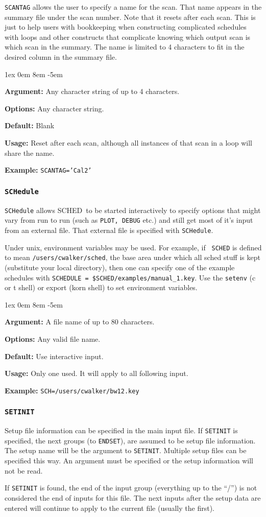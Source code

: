 \documentclass{report}
\newcommand{\schedb}{{\sc SCHED~}}
\newcommand{\rcwbox}[5]{
  \begin{list}{}{\parsep 1ex  \itemsep 0em
                 \leftmargin 8em  \itemindent -5em }
    \item {\bf Argument:} #1
    \item {\bf Options:}  #2
    \item {\bf Default:}  #3
    \item {\bf Usage:}    #4
    \item {\bf Example:}  #5
  \end{list}
}
\begin{document}
{\tt SCANTAG} allows the user to specify a name for the scan.  That
name appears in the summary file under the scan number.  Note that
it resets after each scan.  This is just to help users with bookkeeping
when constructing complicated schedules with loops and other constructs
that complicate knowing which output scan is which scan in the
summary.  The name is limited to 4 characters to fit in the desired
column in the summary file.

\rcwbox
{Any character string of up to 4 characters.}
{Any character string.}
{Blank}
{Reset after each scan, although all instances of that scan in a
loop will share the name.}
{{\tt SCANTAG='Cal2'}}


\subsubsection{\label{MP:SCHEDULE}\tt SCHedule}

{\tt SCHedule} allows \schedb to be started interactively to
specify options that might vary from run to run (such as {\tt PLOT,
DEBUG} etc.) and still get most of it's input from an
external file.  That external file is specified with {\tt SCHedule}.

Under unix, environment variables may be used.  For example, if {\tt
SCHED} is defined to mean {\tt /users/cwalker/sched}, the base
area under which all sched stuff is kept (substitute your local
directory), then one can specify one of the example schedules with
{\tt SCHEDULE = \$SCHED/examples/manual\_1.key}.  Use the {\tt setenv}
(c or t shell) or export (korn shell) to set environment variables.

\rcwbox
{A file name of up to 80 characters.}
{Any valid file name.}
{Use interactive input.}
{Only one used. It will apply to all following input.}
{{\tt SCH=/users/cwalker/bw12.key}}


\subsubsection{\label{MP:SETINIT}{\tt SETINIT}}

Setup file information can be specified in the main input file.  If
{\tt SETINIT} is specified, the next groups (to {\tt ENDSET}), are
assumed to be setup file information.  The setup name will be the
argument to {\tt SETINIT}.  Multiple setup files can be specified
this way.  An argument must be specified or the setup information
will not be read.

If {\tt SETINIT} is found, the end of the input group (everything up
to the ``/'') is not considered the end of inputs for this file.  The
next inputs after the setup data are entered will continue to apply to
the current file (usually the first).
\end{document}
